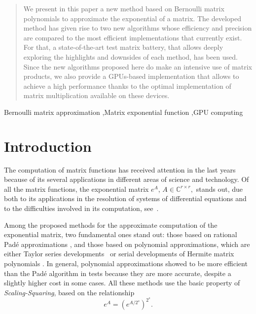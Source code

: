 \documentclass[preprint,10pt,numbers,sort&compress]{elsarticle}
\begin{document}
\begin{frontmatter}

\begin{abstract}
We present in this paper a new method based on Bernoulli matrix polynomials to approximate the exponential of a matrix. 
The developed method has given rise to two new algorithms whose efficiency and precision are compared to the most efficient implementations that currently exist. For that, a state-of-the-art test matrix battery, that allows deeply exploring the highlights and downsides of each method, has been used. 
Since the new algorithms proposed here do make an intensive use of matrix products, we also provide a GPUs-based implementation that allows to achieve a high performance thanks to the optimal implementation of matrix multiplication available on these devices.

\end{abstract}

\begin{keyword}


 Bernoulli matrix approximation \sep Matrix exponential function \sep GPU computing
\end{keyword}

\end{frontmatter}



\section{Introduction}
The computation of matrix functions has received attention in the last years because of its several applications in different areas of science and technology. Of all the matrix functions, the exponential matrix $e^A$, $A \in \mathbb{C}^{r \times r},$ stands out, due both to its applications in the resolution of systems of differential equations and to the difficulties involved in its computation, see~\cite{Vanl75,MoVa78,MoVa03,High08}.

Among the proposed methods for the approximate computation of the exponential matrix, two fundamental ones stand out: those based on rational Pad\'e approximations \cite{BaGr96,DiPa00,AlHi09,High04}, and those based on polynomial approximations, which are either Taylor series developments~\cite{sastre2015new,SIDR11,RSID16,sastre2019boosting} or serial developments of Hermite matrix polynomials  \cite{defez1998some,sastre2011efficient}. In general, polynomial approximations showed to be more efficient than the Pad\'e algorithm in tests because they are more accurate, despite a slightly higher cost in some cases. All these methods use the basic property of \emph{Scaling-Squaring}, based on the relationship
$$
e^{A}=\left(e^{A/2^s} \right)^{2^s}.
$$
\end{document}
